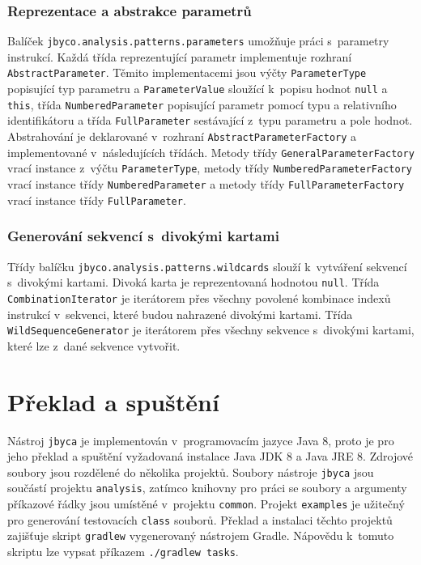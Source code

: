 \subsubsection{Reprezentace a abstrakce parametrů}

Balíček \texttt{jbyco.analysis.patterns.parameters} umožňuje práci s~parametry instrukcí. Každá třída reprezentující parametr implementuje rozhraní \texttt{AbstractParameter}. Těmito implementacemi jsou výčty \texttt{ParameterType} popisující typ parametru a \texttt{ParameterValue} sloužící k~popisu hodnot \texttt{null} a \texttt{this}, třída \texttt{NumberedParameter} popisující parametr pomocí typu a relativního identifikátoru a třída \texttt{FullParameter} sestávající z~typu parametru a pole hodnot. Abstrahování je deklarované v~rozhraní \texttt{AbstractParameterFactory} a implementované v~následujících třídách. Metody třídy \texttt{GeneralParameterFactory} vrací instance z~výčtu \texttt{ParameterType}, metody třídy \texttt{NumberedParameterFactory} vrací instance třídy \texttt{NumberedParameter} a metody třídy \texttt{FullParameterFactory} vrací instance třídy \texttt{FullParameter}.

\subsubsection{Generování sekvencí s~divokými kartami}

Třídy balíčku \texttt{jbyco.analysis.patterns.wildcards} slouží k~vytváření sekvencí s~divokými kartami. Divoká karta je reprezentovaná hodnotou \texttt{null}. Třída \texttt{CombinationIterator} je iterátorem přes všechny povolené kombinace indexů instrukcí v~sekvenci, které budou nahrazené divokými kartami. Třída \texttt{WildSequenceGenerator} je iterátorem přes všechny sekvence s~divokými kartami, které lze z~dané sekvence vytvořit.

\section{Překlad a spuštění}\label{Jbyca:Run}

Nástroj \texttt{jbyca} je implementován v~programovacím jazyce Java 8, proto je pro jeho překlad a spuštění vyžadovaná instalace Java JDK 8 a Java JRE 8.
Zdrojové soubory jsou rozdělené do několika projektů. Soubory nástroje \texttt{jbyca} jsou součástí projektu \texttt{analysis}, zatímco knihovny pro práci se soubory a argumenty příkazové řádky jsou umístěné v~projektu \texttt{common}. Projekt \texttt{examples} je užitečný pro generování testovacích \texttt{class} souborů. Překlad a instalaci těchto projektů zajišťuje skript \texttt{gradlew} vygenerovaný nástrojem Gradle. Nápovědu k~tomuto skriptu lze vypsat příkazem \texttt{./gradlew tasks}. 

